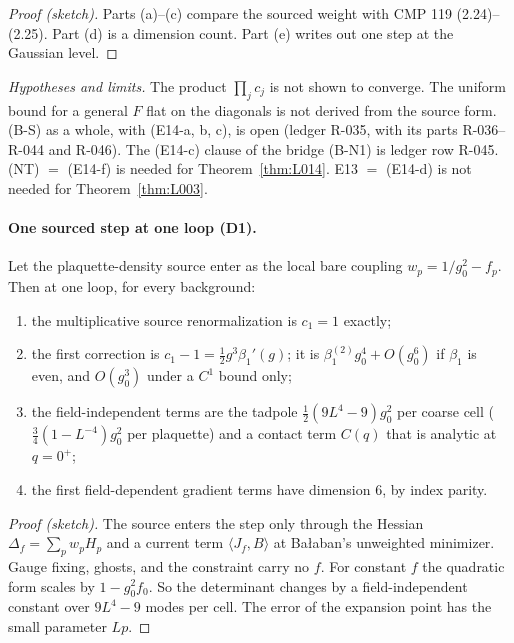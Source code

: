 \begin{proof}[Proof (sketch)]
Parts (a)--(c) compare the sourced weight with CMP 119 (2.24)--(2.25). Part (d) is a dimension count. Part (e) writes out one step at the Gaussian level.
\end{proof}

\emph{Hypotheses and limits.} The product $\prod_jc_j$ is not shown to converge. The uniform bound for a general $F$ flat on the diagonals is not derived from the source form. (B-S) as a whole, with (E14-a, b, c), is open (ledger R-035, with its parts R-036--R-044 and R-046). The (E14-c) clause of the bridge (B-N1) is ledger row R-045. (NT) $=$ (E14-f) is needed for Theorem~\ref{thm:L014}. E13 $=$ (E14-d) is not needed for Theorem~\ref{thm:L003}.

\paragraph{One sourced step at one loop (D1).}

\begin{proposition}\label{src:D1}
Let the plaquette-density source enter as the local bare coupling $w_p=1/g_0^2-f_p$. Then at one loop, for every background:
\begin{enumerate}
\item[(a)] the multiplicative source renormalization is $c_1=1$ exactly;
\item[(b)] the first correction is $c_1-1=\tfrac12g^3\beta_1'(g)$; it is $\beta_1^{(2)}g_0^4+O(g_0^6)$ if $\beta_1$ is even, and $O(g_0^3)$ under a $C^1$ bound only;
\item[(c)] the field-independent terms are the tadpole $\tfrac12(9L^4-9)g_0^2$ per coarse cell ($\tfrac34(1-L^{-4})g_0^2$ per plaquette) and a contact term $C(q)$ that is analytic at $q=0^+$;
\item[(d)] the first field-dependent gradient terms have dimension 6, by index parity.
\end{enumerate}
\end{proposition}

\begin{proof}[Proof (sketch)]
The source enters the step only through the Hessian $\Delta_f=\sum_pw_pH_p$ and a current term $\langle J_f,B\rangle$ at Ba{\l}aban's unweighted minimizer. Gauge fixing, ghosts, and the constraint carry no $f$. For constant $f$ the quadratic form scales by $1-g_0^2f_0$. So the determinant changes by a field-independent constant over $9L^4-9$ modes per cell. The error of the expansion point has the small parameter $Lp$.
\end{proof}

